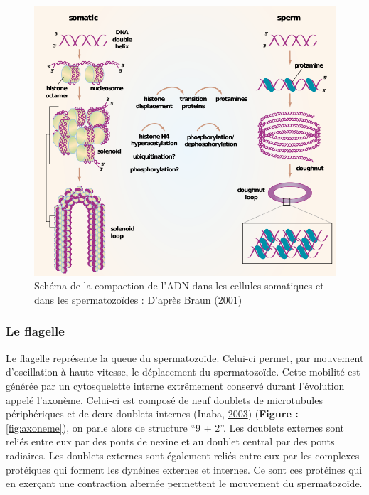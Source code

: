 \documentclass[12pt,twoside]{reedthesis}
\theoremstyle{definition}
\theoremstyle{definition}
\theoremstyle{remark}
\begin{document}
  \begin{figure}
  
  {\centering \includegraphics[scale=.55]{figure/noyau} 
  
  }
  
  \caption[Schéma de la compaction de l’ADN dans les cellules somatiques et dans les spermatozoïdes]{Schéma de la compaction de l’ADN dans les cellules somatiques et dans les spermatozoïdes : D'après Braun (2001)}\label{fig:noyau}
  \end{figure}
  
  \subsubsection{Le flagelle}\label{le-flagelle}
  
  Le flagelle représente la queue du spermatozoïde. Celui-ci permet, par
  mouvement d'oscillation à haute vitesse, le déplacement du
  spermatozoïde. Cette mobilité est générée par un cytosquelette interne
  extrêmement conservé durant l'évolution appelé l'axonème. Celui-ci est
  composé de neuf doublets de microtubules périphériques et de deux
  doublets internes (Inaba, \protect\hyperlink{ref-Inaba2003}{2003})
  (\textbf{Figure : }\ref{fig:axoneme}), on parle alors de structure ``9 +
  2''. Les doublets externes sont reliés entre eux par des ponts de nexine
  et au doublet central par des ponts radiaires. Les doublets externes
  sont également reliés entre eux par les complexes protéiques qui forment
  les dynéines externes et internes. Ce sont ces protéines qui en exerçant
  une contraction alternée permettent le mouvement du spermatozoïde.
  
\end{document}

